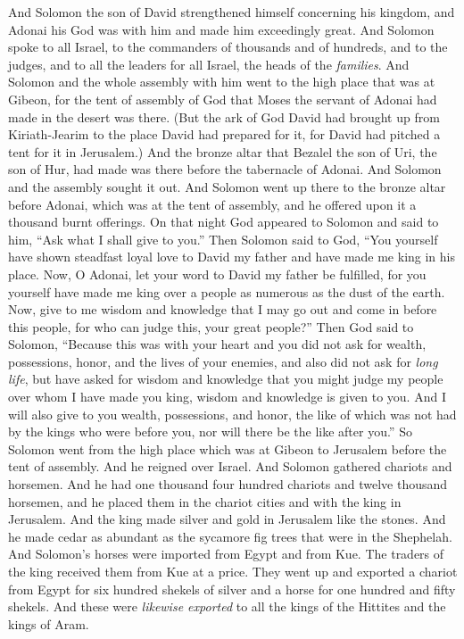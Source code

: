 
\begin{biblechapter} %
 And Solomon the son of David strengthened himself concerning his kingdom, and Adonai his God was with him and made him exceedingly great.
\verse And Solomon spoke to all Israel, to the commanders of thousands and of hundreds, and to the judges, and to all the leaders for all Israel, the heads of the \textit{families}.
\verse And Solomon and the whole assembly with him went to the high place that was at Gibeon, for the tent of assembly of God that Moses the servant of Adonai had made in the desert was there.
\verse (But the ark of God David had brought up from Kiriath-Jearim to the place David had prepared for it, for David had pitched a tent for it in Jerusalem.)
\verse And the bronze altar that Bezalel the son of Uri, the son of Hur, had made was there before the tabernacle of Adonai. And Solomon and the assembly sought it out.
\verse And Solomon went up there to the bronze altar before Adonai, which was at the tent of assembly, and he offered upon it a thousand burnt offerings.
 On that night God appeared to Solomon and said to him, “Ask what I shall give to you.”
\verse Then Solomon said to God, “You yourself have shown steadfast loyal love to David my father and have made me king in his place.
\verse Now, O Adonai, let your word to David my father be fulfilled, for you yourself have made me king over a people as numerous as the dust of the earth.
\verse Now, give to me wisdom and knowledge that I may go out and come in before this people, for who can judge this, your great people?”
\verse Then God said to Solomon, “Because this was with your heart and you did not ask for wealth, possessions, honor, and the lives of your enemies, and also did not ask for \textit{long life}, but have asked for wisdom and knowledge that you might judge my people over whom I have made you king,
\verse wisdom and knowledge is given to you. And I will also give to you wealth, possessions, and honor, the like of which was not had by the kings who were before you, nor will there be the like after you.”
\verse So Solomon went from the high place which was at Gibeon to Jerusalem before the tent of assembly. And he reigned over Israel.
 And Solomon gathered chariots and horsemen. And he had one thousand four hundred chariots and twelve thousand horsemen, and he placed them in the chariot cities and with the king in Jerusalem.
\verse And the king made silver and gold in Jerusalem like the stones. And he made cedar as abundant as the sycamore fig trees that were in the Shephelah.
\verse And Solomon’s horses were imported from Egypt and from Kue. The traders of the king received them from Kue at a price.
\verse They went up and exported a chariot from Egypt for six hundred shekels of silver and a horse for one hundred and fifty shekels. And these were \textit{likewise exported} to all the kings of the Hittites and the kings of Aram.
\end{biblechapter}

